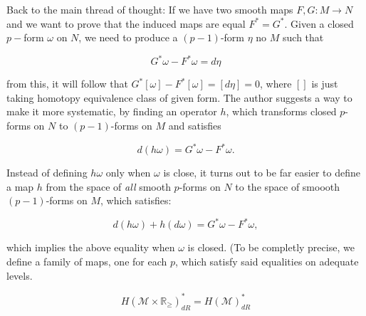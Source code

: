 \documentclass[licencjacka]{pracamgr}
\theoremstyle{definition}
\theoremstyle{remark}
\begin{document}
Back to the main thread of thought: If we have two smooth maps $F, G:
M \rightarrow N$ and we want to prove that the induced maps are equal
$F^\ast = G^\ast$. Given a closed $p-$form $\omega$ on $N$, we need to
produce a $(p-1)$-form $\eta$ no $M$ such that

\[
    G^\ast \omega - F^\ast \omega = d\eta
\]

from this, it will follow that $ G^\ast [\omega] - F^\ast [\omega] =
[d\eta] = 0$, where $[]$ is just taking homotopy equivalence class
of given form. The author suggests a way to make it more systematic,
by finding an operator $h$, which transforms closed $p$-forms on $N$
to $(p-1)$-forms on $M$ and satisfies

\[
    d(h\omega) = G^\ast \omega - F^\ast \omega.
\]

Instead of defining $h\omega$ only when $\omega$ is close, it turns
out to be far easier to define a map $h$ from the space of
\textit{all} smooth $p$-forms on $N$ to the space of smoooth
$(p-1)$-forms on $M$, which satisfies:

\[
    d(h\omega) + h(d\omega) = G^\ast \omega - F^\ast \omega ,
\]

which implies the above equality when $\omega$ is closed. (To be
completly precise, we define a family of maps, one for each $p$, which
satisfy said equalities on adequate levels.

\[
    H(\mathcal{M} \times \mathbb{R}_{\geq})_{dR}^\ast = H(\mathcal{M})_{dR}^\ast
\]

\normalsize



\end{document}
